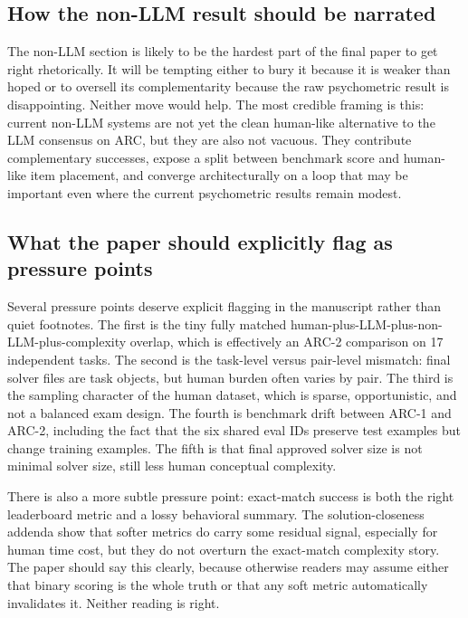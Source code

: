 \documentclass[11pt,letterpaper]{article}
\begin{document}
\subsection{How the non-LLM result should be narrated}

The non-LLM section is likely to be the hardest part of the final paper to get right rhetorically. It will be tempting either to bury it because it is weaker than hoped or to oversell its complementarity because the raw psychometric result is disappointing. Neither move would help. The most credible framing is this: current non-LLM systems are not yet the clean human-like alternative to the LLM consensus on ARC, but they are also not vacuous. They contribute complementary successes, expose a split between benchmark score and human-like item placement, and converge architecturally on a loop that may be important even where the current psychometric results remain modest.

\subsection{What the paper should explicitly flag as pressure points}

Several pressure points deserve explicit flagging in the manuscript rather than quiet footnotes. The first is the tiny fully matched human-plus-LLM-plus-non-LLM-plus-complexity overlap, which is effectively an ARC-2 comparison on 17 independent tasks. The second is the task-level versus pair-level mismatch: final solver files are task objects, but human burden often varies by pair. The third is the sampling character of the human dataset, which is sparse, opportunistic, and not a balanced exam design. The fourth is benchmark drift between ARC-1 and ARC-2, including the fact that the six shared eval IDs preserve test examples but change training examples. The fifth is that final approved solver size is not minimal solver size, still less human conceptual complexity.

There is also a more subtle pressure point: exact-match success is both the right leaderboard metric and a lossy behavioral summary. The solution-closeness addenda show that softer metrics do carry some residual signal, especially for human time cost, but they do not overturn the exact-match complexity story. The paper should say this clearly, because otherwise readers may assume either that binary scoring is the whole truth or that any soft metric automatically invalidates it. Neither reading is right.
\end{document}
